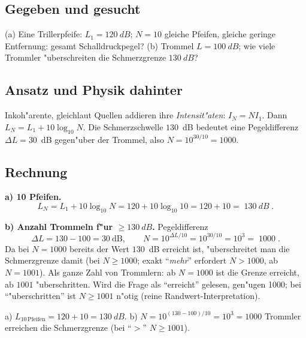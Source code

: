 
\subsection*{Gegeben und gesucht}
(a) Eine Trillerpfeife: $L_1=\qty{120}{dB}$; $N=10$ gleiche Pfeifen, gleiche
geringe Entfernung: gesamt Schalldruckpegel? (b) Trommel $L=\qty{100}{dB}$;
wie viele Trommler "uberschreiten die Schmerzgrenze $\qty{130}{dB}$?

\subsection*{Ansatz und Physik dahinter}
Inkoh"arente, gleichlaut Quellen addieren ihre \emph{Intensit"aten}:
$I_N=N I_1$. Dann
$L_N=L_1+10\log_{10}N$. Die Schmerzschwelle $130$~dB bedeutet eine
Pegeldifferenz $\Delta L=30$~dB gegen"uber der Trommel, also $N=10^{30/10}=1000$.

\subsection*{Rechnung}
\textbf{a) 10 Pfeifen.}
\begin{equation}
  L_N=L_1+10\log_{10}N
  =120+10\log_{10}10
  =120+10
  =\boxed{\;\qty{130}{dB}\;}.
\end{equation}

\textbf{b) Anzahl Trommeln f"ur $\ge\qty{130}{dB}$.} Pegeldifferenz
\begin{equation}
  \Delta L=130-100=30\ \mathrm{dB},\qquad
  N=10^{\Delta L/10}=10^{30/10}=10^{3}
  =\boxed{\;1000\;}.
\end{equation}
Da bei $N=1000$ bereits der Wert $130$~dB erreicht ist, "uberschreitet man
die Schmerzgrenze damit (bei $N\ge1000$; exakt ``\emph{mehr}'' erfordert
$N>1000$, ab $N=1001$). Als ganze Zahl von Trommlern: ab $N=1000$ ist die
Grenze erreicht, ab $1001$ "uberschritten. Wird die Frage als ``erreicht''
gelesen, gen"ugen 1000; bei ``"uberschritten'' ist $N\ge1001$ n"otig
(reine Randwert-Interpretation).

\begin{ergebnis}
a) $L_{10\,\text{Pfeifen}}=120+10=\boxed{\qty{130}{dB}}$.
b) $N=10^{(130-100)/10}=10^{3}=\boxed{1000}$ Trommler erreichen die
Schmerzgrenze (bei ``$>$'' $N\ge1001$).
\end{ergebnis}

